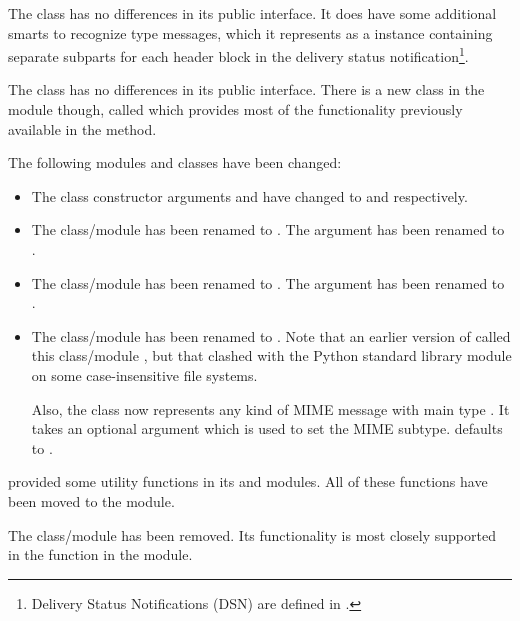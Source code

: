 The  class has no differences in its public interface.
It does have some additional smarts to recognize
 type messages, which it represents as
a  instance containing separate 
subparts for each header block in the delivery status
notification\footnote{Delivery Status Notifications (DSN) are defined
in .}.

The  class has no differences in its public
interface.  There is a new class in the 
module though, called  which provides most of
the functionality previously available in the
 method.

The following modules and classes have been changed:

\begin{itemize}
\item The  class constructor arguments 
      and  have changed to  and
       respectively.
\item The  class/module has been renamed to
      .  The  argument has been renamed to
      .
\item The  class/module has been renamed to
      .  The  argument has been renamed to
      .
\item The  class/module has been renamed to
      .  Note that an earlier version of
       called this class/module , but
      that clashed with the Python standard library module
       on some case-insensitive file systems.

      Also, the  class now represents any kind of
      MIME message with main type .  It takes an
      optional argument  which is used to set the MIME
      subtype.   defaults to .
\end{itemize}

 provided some utility functions in its
 and  modules.  All of these functions
have been moved to the  module.

The  class/module has been removed.  Its functionality
is most closely supported in the 
function in the  module.

